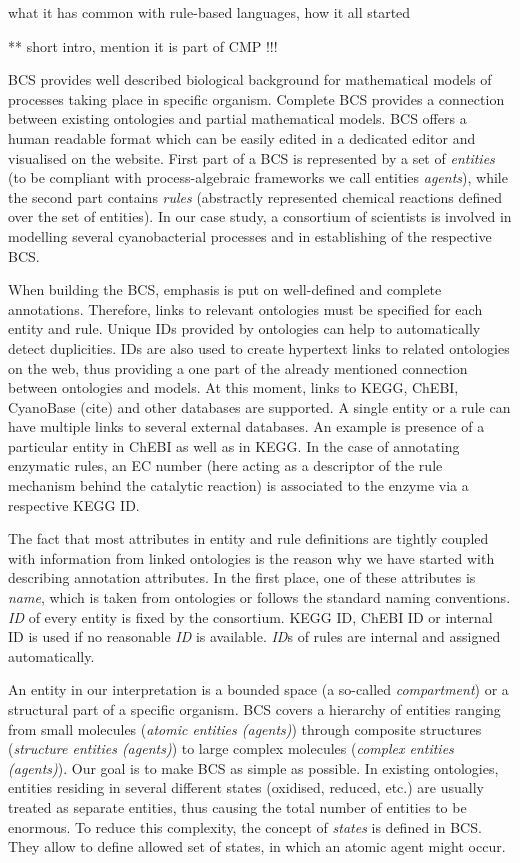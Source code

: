 \documentclass[12pt]{fithesis2}
\begin{document}
what it has common with rule-based languages, how it all started

** short intro, mention it is part of CMP !!!

BCS provides well described biological background for mathematical models of processes taking place in specific organism. Complete BCS provides a connection between existing ontologies and partial mathematical models. BCS offers a human readable format which can be easily edited in a dedicated editor and visualised on the website. First part of a BCS is represented by a set of \emph{entities} (to be compliant with process-algebraic frameworks we call entities \emph{agents}), while the second part contains \emph{rules} (abstractly represented chemical reactions defined over the set of entities). In our case study, a consortium of scientists is involved in modelling several cyanobacterial processes and in establishing of the respective BCS.

When building the BCS, emphasis is put on well-defined and complete annotations. Therefore, links to relevant ontologies must be specified for each entity and rule. Unique IDs provided by ontologies can help to automatically detect duplicities. IDs are also used to create hypertext links to related ontologies on the web, thus providing a one part of the already mentioned connection between ontologies and models. At this moment, links to KEGG, ChEBI, CyanoBase (cite) and other databases are supported. A single entity or a rule can have multiple links to several external databases. An example is presence of a particular entity in ChEBI as well as in KEGG. In the case of annotating enzymatic rules, an EC number (here acting as a descriptor of the rule mechanism behind the catalytic reaction) is associated to the enzyme via a respective KEGG ID.

The fact that most attributes in entity and rule definitions are tightly coupled with information from linked ontologies is the reason why we have started with describing annotation attributes. In the first place, one of these attributes is \emph{name}, which is taken from ontologies or follows the standard naming conventions. \emph{ID} of every entity is fixed by the consortium. KEGG ID, ChEBI ID or internal ID is used if no reasonable \emph{ID} is available. \emph{ID}s of rules are internal and assigned automatically.

An entity in our interpretation is a bounded space (a so-called \emph{compartment}) or a structural part of a specific organism. BCS covers a hierarchy of entities ranging from small molecules (\emph{atomic entities (agents)}) through composite structures (\emph{structure entities (agents)}) to large complex molecules (\emph{complex entities (agents)}). Our goal is to make BCS as simple as possible. In existing ontologies, entities residing in several different states (oxidised, reduced, etc.) are usually treated as separate entities, thus causing the total number of entities to be enormous. To reduce this complexity, the concept of \emph{states} is defined in BCS. They allow to define allowed set of states, in which an atomic agent might occur.
\end{document}
